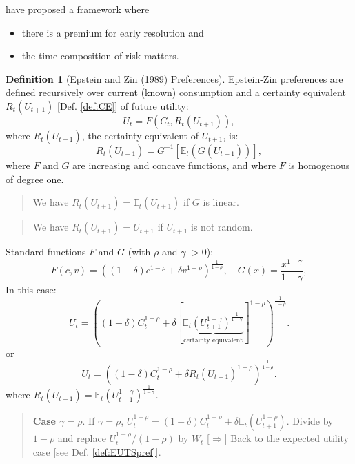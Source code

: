 \documentclass[
  12pt,
]{book}
\providecommand{\tightlist}{%
  \setlength{\itemsep}{0pt}\setlength{\parskip}{0pt}}
\theoremstyle{definition}
\newtheorem{definition}{Definition}[chapter]
\theoremstyle{definition}
\theoremstyle{definition}
\theoremstyle{definition}
\theoremstyle{remark}
\begin{document}
\citet{Epstein_Zin_1989} have proposed a framework where

\begin{itemize}
\tightlist
\item
  there is a premium for early resolution and
\item
  the time composition of risk matters.
\end{itemize}

\begin{definition}[Epstein and Zin (1989) Preferences]
\protect\hypertarget{def:EZ}{}\label{def:EZ}Epstein-Zin preferences are defined recursively over current (known) consumption and a certainty equivalent
\(R_t(U_{t+1})\) {[}Def. \ref{def:CE}{]} of future utility:
\[
U_{t} = F(C_t,R_t(U_{t+1})),
\]
where \(R_t(U_{t+1})\), the certainty equivalent of \(U_{t+1}\), is:
\[
R_t(U_{t+1}) = G^{-1}[\mathbb{E}_t(G(U_{t+1}))],
\]
where \(F\) and \(G\) are increasing and concave functions, and where \(F\) is homogenous of degree one.
\end{definition}

\begin{quote}
We have \(R_t(U_{t+1})=\mathbb{E}_t(U_{t+1})\) if \(G\) is linear.
\end{quote}

\begin{quote}
We have \(R_t(U_{t+1})=U_{t+1}\) if \(U_{t+1}\) is not random.
\end{quote}

Standard functions \(F\) and \(G\) (with \(\rho\) and \(\gamma\) \(>0\)):
\[
F(c,v) = \left((1-\delta)c^{1-\rho} + \delta v^{1-\rho}\right)^{\frac{1}{1-\rho}}, \quad G(x)=\frac{x^{1-\gamma}}{1-\gamma},
\]
In this case:
\begin{equation}
\boxed{ U_t = \left((1-\delta)C_t^{1-\rho}+\delta \left[\underbrace{ \mathbb{E}_t\left(U_{t+1}^{1-\gamma}\right)^{\frac{1}{1-\gamma}} }_{\mbox{certainty equivalent}}\right] ^{1-\rho}\right)^{\frac{1}{1-\rho}}.}\label{eq:EZpreferences}
\end{equation}
or
\[
U_t = \left((1-\delta)C_t^{1-\rho} + \delta R_t(U_{t+1})^{1-\rho}\right)^{\frac{1}{1-\rho}}.
\]
where \(R_t(U_{t+1})=\mathbb{E}_t(U_{t+1}^{1-\gamma})^{\frac{1}{1-\gamma}}\).

\begin{quote}
\textbf{Case \(\gamma = \rho\)}. If \(\gamma = \rho\), \(U_t^{1-\rho}=(1-\delta)C_t^{1-\rho} + \delta \mathbb{E}_t(U_{t+1}^{1-\rho})\).
Divide by \(1-\rho\) and replace \(U_t^{1-\rho}/(1-\rho)\) by \(W_t\)
{[}\(\Rightarrow\){]} Back to the expected utility case {[}see Def. \ref{def:EUTSpref}{]}.
\end{quote}
\end{document}
